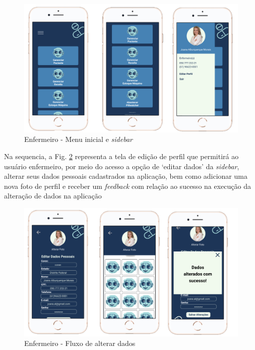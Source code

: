 \begin{figure}[H]
    \centering
    \includegraphics[width=15cm]{figuras/software/Atual_prototipo/Enfermeiro_TelaInicial_e_Sidebar.png}
    \caption{Enfermeiro - Menu inicial e \textit{sidebar}}
    \label{fig:prototipo_enfermeiro_menuInicial_e_Sidebar}
\end{figure}

Na sequencia, a Fig. \ref{fig:prototipo_enfermeiro_alterarDados} representa a tela de edição de perfil que permitirá ao usuário enfermeiro, por meio do acesso a opção de `editar dados' da \emph{sidebar}, alterar seus dados pessoais cadastrados na aplicação, bem como adicionar uma nova foto de perfil e receber um \textit{feedback} com relação ao sucesso na execução da alteração de dados na aplicação

\begin{figure}[H]
    \centering
    \includegraphics[width=15cm]{figuras/software/Atual_prototipo/Enfermeiro_alterarDados.png}
    \caption{Enfermeiro - Fluxo de alterar dados}
    \label{fig:prototipo_enfermeiro_alterarDados}
\end{figure}

